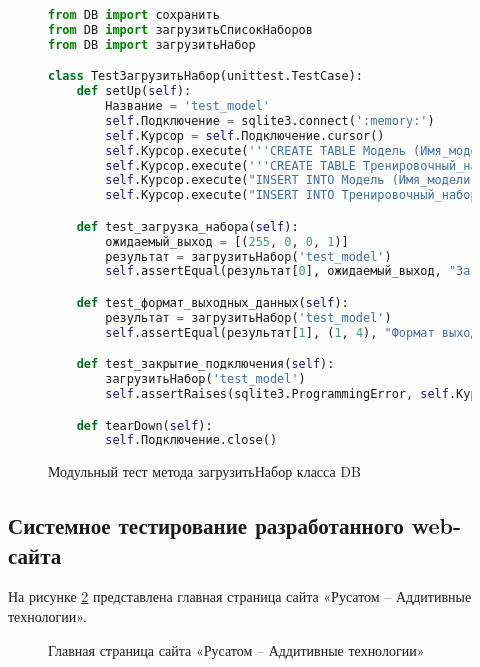 \newpage
\begin{figure}[ht]
\begin{lstlisting}[language=Python]
from DB import сохранить
from DB import загрузитьСписокНаборов
from DB import загрузитьНабор

class TestЗагрузитьНабор(unittest.TestCase):
    def setUp(self):
        Название = 'test_model'
        self.Подключение = sqlite3.connect(':memory:')
        self.Курсор = self.Подключение.cursor()
        self.Курсор.execute('''CREATE TABLE Модель (Имя_модели TEXT, ИД_Тренировочного_набора INTEGER)''')
        self.Курсор.execute('''CREATE TABLE Тренировочный_набор (ИД_тренировочного_набора INTEGER, Красный_канал INTEGER, Синий_канал INTEGER, Зелёный_канал INTEGER, Выходные_данные INTEGER)''')
        self.Курсор.execute("INSERT INTO Модель (Имя_модели, ИД_Тренировочного_набора) VALUES (?, ?)", (Название, 1))
        self.Курсор.execute("INSERT INTO Тренировочный_набор (ИД_тренировочного_набора, Красный_канал, Синий_канал, Зелёный_канал, Выходные_данные) VALUES (1, 255, 0, 0, 1)")

    def test_загрузка_набора(self):
        ожидаемый_выход = [(255, 0, 0, 1)]
        результат = загрузитьНабор('test_model')
        self.assertEqual(результат[0], ожидаемый_выход, "Загруженный набор должен соответствовать ожидаемому")

    def test_формат_выходных_данных(self):
        результат = загрузитьНабор('test_model')
        self.assertEqual(результат[1], (1, 4), "Формат выходных данных должен быть кортежем с размерностью набора")

    def test_закрытие_подключения(self):
        загрузитьНабор('test_model')
        self.assertRaises(sqlite3.ProgrammingError, self.Курсор.execute, "SELECT * FROM Модель")

    def tearDown(self):
        self.Подключение.close()
\end{lstlisting}  
\caption{Модульный тест метода загрузитьНабор класса DB}
\label{test6:image}
\end{figure}

\newpage 
\subsection{Системное тестирование разработанного web-сайта}

На рисунке \ref{usecase:image} представлена главная страница сайта «Русатом – Аддитивные технологии».
\newpage %
\begin{figure}[H] %
\caption{Главная страница сайта «Русатом – Аддитивные технологии»}
\label{usecase:image}
\end{figure}


